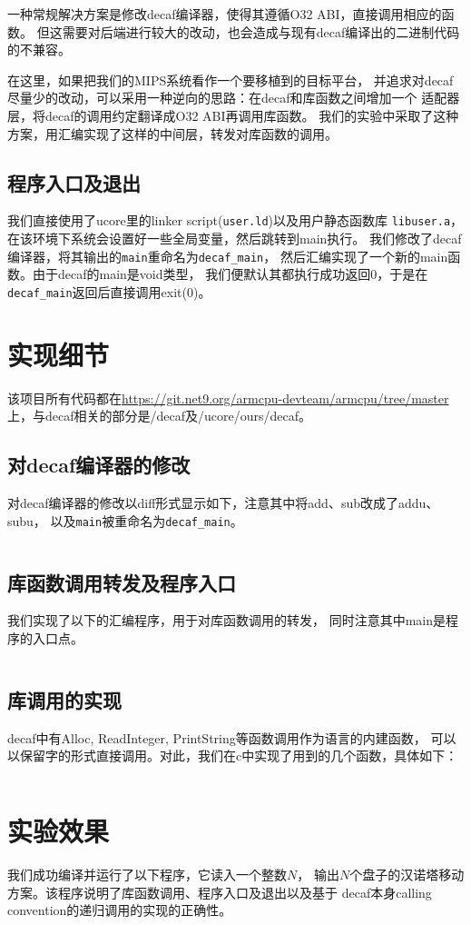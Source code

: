 \documentclass[a4paper]{article}
\begin{document}
一种常规解决方案是修改decaf编译器，使得其遵循O32 ABI，直接调用相应的函数。
但这需要对后端进行较大的改动，也会造成与现有decaf编译出的二进制代码的不兼容。

在这里，如果把我们的MIPS系统看作一个要移植到的目标平台，
并追求对decaf尽量少的改动，可以采用一种逆向的思路：在decaf和库函数之间增加一个
适配器层，将decaf的调用约定翻译成O32 ABI再调用库函数。
我们的实验中采取了这种方案，用汇编实现了这样的中间层，转发对库函数的调用。

\subsection{程序入口及退出}
我们直接使用了ucore里的linker script(\verb|user.ld|)以及用户静态函数库
\verb|libuser.a|，在该环境下系统会设置好一些全局变量，然后跳转到main执行。
我们修改了decaf编译器，将其输出的\verb|main|重命名为\verb|decaf_main|，
然后汇编实现了一个新的main函数。由于decaf的main是void类型，
我们便默认其都执行成功返回0，于是在\verb|decaf_main|返回后直接调用exit(0)。


\section{实现细节}
该项目所有代码都在\url{https://git.net9.org/armcpu-devteam/armcpu/tree/master}
上，与decaf相关的部分是/decaf及/ucore/ours/decaf。

\subsection{对decaf编译器的修改}
对decaf编译器的修改以diff形式显示如下，注意其中将add、sub改成了addu、subu，
以及\verb|main|被重命名为\verb|decaf_main|。
\inputminted[linenos,fontsize=\small,tabsize=4]{diff}{../decaf.diff}


\subsection{库函数调用转发及程序入口}
我们实现了以下的汇编程序，用于对库函数调用的转发，
同时注意其中main是程序的入口点。
\inputminted[linenos,fontsize=\small,tabsize=4]{nasm}{../entry.s}

\subsection{库调用的实现}
decaf中有Alloc, ReadInteger, PrintString等函数调用作为语言的内建函数，
可以以保留字的形式直接调用。对此，我们在c中实现了用到的几个函数，具体如下：
\inputminted[linenos,fontsize=\small,tabsize=4]{c}{../userlib.c}


\section{实验效果}
我们成功编译并运行了以下程序，它读入一个整数$N$，
输出$N$个盘子的汉诺塔移动方案。该程序说明了库函数调用、程序入口及退出以及基于
decaf本身calling convention的递归调用的实现的正确性。
\inputminted[linenos,fontsize=\small,tabsize=4]{java}{../hanoi.decaf}
\end{document}

